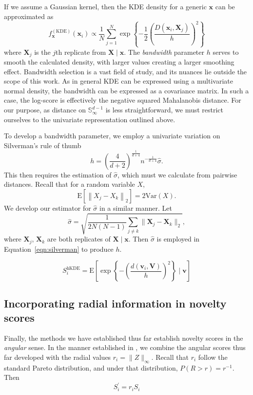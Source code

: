 If we assume a Gaussian kernel, then the KDE density for a generic $\bm{x}$ can 
  be approximated as 
  \begin{equation}
    \label{eq:ad_kde}
    f_{\bm{x}}^{(\text{KDE})}(\bm{x}_i) \propto 
    \frac{1}{N}\sum_{j = 1}^{N}\exp
    \left\lbrace-\frac{1}{2}\left(\frac{D(\bm{x}_i,\bm{X}_j)}{h}\right)^2\right\rbrace
  \end{equation}
  where $\bm{X}_j$ is the $j$th 
  replicate from $\bm{X}\mid\bm{x}$.  The \emph{bandwidth} parameter $h$ serves to smooth
  the calculated density, with larger values creating a larger smoothing effect.
  Bandwidth selection is a vast field of study, and its nuances lie outside the
  scope of this work.  As in general KDE can be expressed using a multivariate normal density,
  the bandwidth can be expressed as a covariance matrix.  In such a case, the log-score
  is effectively the negative squared Mahalanobis distance.  For our purpose, as 
  distance on $\mathbb{S}_{\infty}^{d-1}$ is less straightforward, we must restrict 
  ourselves to the univariate representation outlined above.

To develop a bandwidth parameter, we employ a univariate variation on Silverman's 
  rule of thumb
  \begin{equation}
    \label{eqn:silverman}
    h = \left(\frac{4}{d+2}\right)^{\frac{1}{d+4}}n^{-\frac{1}{d+4}}\hat{\sigma}.
  \end{equation}
  This then requires the estimation of $\hat{\sigma}$, which must we calculate from 
  pairwise distances. Recall that for a random variable $X$, 
  \[ \text{E}\left[\left\lVert X_j - X_k\right\rVert_2\right] = 2\text{Var}(X). \]
  We develop our estimator for $\hat{\sigma}$ in a similar manner.  Let
  \[
    \hat{\sigma} = \sqrt{\frac{1}{2N(N-1)}\sum_{j\neq k}\lVert \bm{X}_j - \bm{X}_k\rVert_2},
  \]
  where $\bm{X}_j$, $\bm{X}_k$ are both replicates of $\bm{X}\mid\bm{x}$. Then 
  $\hat{\sigma}$ is employed in Equation~\ref{eqn:silverman} to produce $h$.
 
\begin{equation}
    \label{eqn:ad_kde_h}
    S_i^{\text{hKDE}} = \text{E}\left[\exp\left\lbrace -
    \left(\frac{d(\bm{v}_i,\bm{V})}{h}\right)^2\right\rbrace\mid\bm{v}\right]
\end{equation}

\subsection{Incorporating radial information in novelty scores}
Finally, the methods we have established thus far establish novelty scores in 
  the \emph{angular} sense.  In the manner established in \cite{goix2017}, we 
  combine the angular scores thus far developed with the radial values 
  $r_i = \lVert Z \rVert_{\infty}$.  Recall that $r_i$ follow the standard 
  Pareto distribution, and under that distribution, $P(R > r) = r^{-1}$.  Then
  \[
    S_i^{\prime} = r_iS_i
  \]

